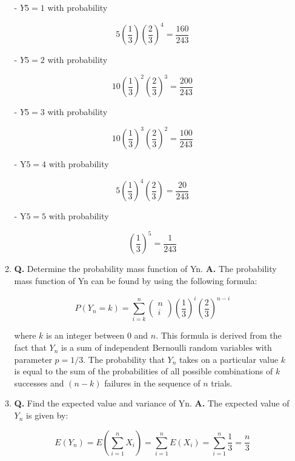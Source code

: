 \documentclass[main.tex]{subfiles}
\begin{document}
\begin{enumerate}
\begin{enumerate}
        - $Y 5=1$ with probability
        
        $$
        5\left(\frac{1}{3}\right)\left(\frac{2}{3}\right)^4=\frac{160}{243}
        $$
        
        - $Y 5=2$ with probability
        
        $$
        10\left(\frac{1}{3}\right)^2\left(\frac{2}{3}\right)^3=\frac{200}{243}
        $$
        
        - $Y 5=3$ with probability
        
        $$
        10\left(\frac{1}{3}\right)^3\left(\frac{2}{3}\right)^2=\frac{100}{243}
        $$
        
        - $\mathrm{Y} 5=4$ with probability
        
        $$
        5\left(\frac{1}{3}\right)^4\left(\frac{2}{3}\right)=\frac{20}{243}
        $$
        
        - $\mathrm{Y} 5=5$ with probability
        
        $$
        \left(\frac{1}{3}\right)^5=\frac{1}{243}
        $$
        
        \item \textbf{Q.} Determine the probability mass function of Yn. \textbf{A.} The probability mass function of Yn can be found by using the following formula:
        
        $$
        P\left(Y_n=k\right)=\sum_{i=k}^n\left(\begin{array}{l}
        n \\
        i
        \end{array}\right)\left(\frac{1}{3}\right)^i\left(\frac{2}{3}\right)^{n-i}
        $$
        
        where $k$ is an integer between 0 and $n$. This formula is derived from the fact that $Y_n$ is a sum of independent Bernoulli random variables with parameter $p=1/3$. The probability that $Y_n$ takes on a particular value $k$ is equal to the sum of the probabilities of all possible combinations of $k$ successes and $(n-k)$ failures in the sequence of $n$ trials.
        
        \item \textbf{Q.} Find the expected value and variance of $\mathrm{Yn}$. \textbf{A.} The expected value of $Y_n$ is given by:
        
        $$
        E\left(Y_n\right)=E\left(\sum_{i=1}^n X_i\right)=\sum_{i=1}^n E\left(X_i\right)=\sum_{i=1}^n \frac{1}{3}=\frac{n}{3}
        $$
        

\end{enumerate}
\end{enumerate}
\end{document}
